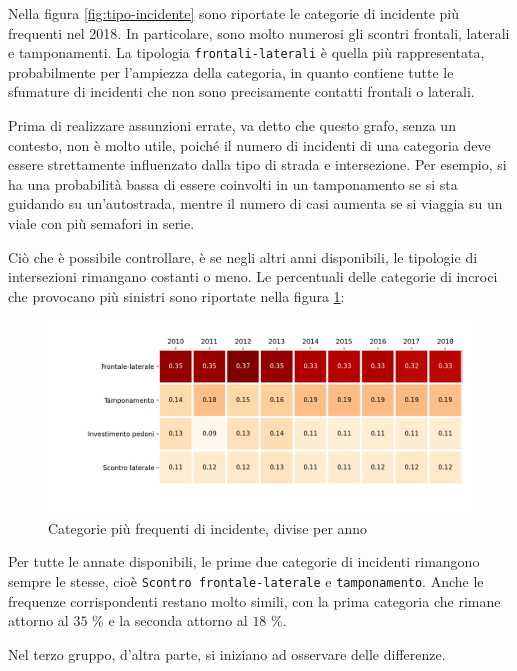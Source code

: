\documentclass[a4paper,12pt]{report}
\newcommand{\columnstyle}[1]{\texttt{#1}}
\begin{document}
Nella figura \ref{fig:tipo-incidente} sono riportate le categorie di 
incidente più frequenti nel 2018. 
In particolare, sono molto numerosi gli scontri frontali, laterali e tamponamenti. 
La tipologia \columnstyle{frontali-laterali} è quella più rappresentata, 
probabilmente per l'ampiezza della categoria, in quanto contiene 
tutte le sfumature di incidenti che non sono 
precisamente contatti frontali o laterali. 

Prima di realizzare assunzioni errate, va detto che questo grafo, senza un contesto, 
non è molto utile, poiché il numero di incidenti di una categoria deve 
essere strettamente influenzato dalla tipo di strada e intersezione. 
Per esempio, si ha una probabilità bassa di essere coinvolti in un tamponamento 
se si sta guidando su un'autostrada, mentre il numero di casi aumenta se si viaggia 
su un viale con più semafori in serie. 

Ciò che è possibile controllare, è se negli altri anni disponibili, le 
tipologie di intersezioni rimangano costanti o meno. 
Le percentuali delle categorie di incroci che provocano più sinistri 
sono riportate nella figura \ref{fig:rapporto-tipologie}: 

\begin{figure}
    \includegraphics[width=\linewidth]{../src/incidenti/incidenti_senza_coords/localizzazione_incidente/rapporto_tipologie.png}
    \caption{Categorie più frequenti di incidente, divise per anno}
    \label{fig:rapporto-tipologie}
\end{figure}

Per tutte le annate disponibili, le prime due categorie di incidenti rimangono sempre 
le stesse, cioè \columnstyle{Scontro frontale-laterale} e \columnstyle{tamponamento}. 
Anche le frequenze corrispondenti restano molto simili, con la prima 
categoria che rimane attorno al $35$ \% e la seconda attorno al $18$ \%. 

Nel terzo gruppo, d'altra parte, si iniziano ad osservare delle differenze. 
\end{document}
